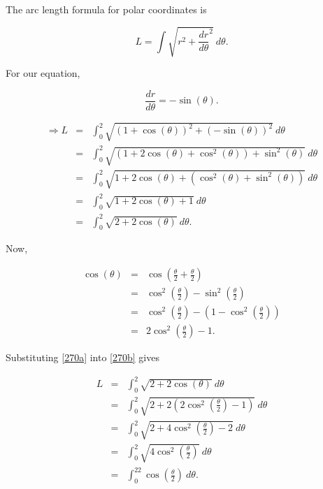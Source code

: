 

 The arc length formula for polar coordinates is

\[L=\int{\sqrt{r^2+\frac{dr}{d\theta}^2}~d\theta.}\]

For our equation,

\[\frac{dr}{d\theta}=-\sin\left(\theta\right).\]

\begin{eqnarray}
	\Rightarrow L&=&\int_0^2\sqrt{\left(1+\cos\left(\theta\right)\right)^2+\left(-\sin\left(\theta\right)\right)^2}~d\theta\nonumber\\
	&=&\int_0^2\sqrt{\left(1+2\cos\left(\theta\right)+\cos^2\left(\theta\right)\right)+\sin^2\left(\theta\right)}~d\theta\nonumber\\
	&=&\int_0^2\sqrt{1+2\cos\left(\theta\right)+\left(\cos^2\left(\theta\right)+\sin^2\left(\theta\right)\right)}~d\theta\nonumber\\
	&=&\int_0^2\sqrt{1+2\cos\left(\theta\right)+1}~d\theta\nonumber\\
	&=&\int_0^2\sqrt{2+2\cos\left(\theta\right)}~d\theta.\label{270b}
\end{eqnarray}

Now,

\begin{eqnarray}
	\cos\left(\theta\right)&=&\cos\left(\frac{\theta}{2}+\frac{\theta}{2}\right)\nonumber\\
	&=&\cos^2\left(\frac{\theta}{2}\right)-\sin^2\left(\frac{\theta}{2}\right)\nonumber\\
	&=&\cos^2\left(\frac{\theta}{2}\right)-\left(1-\cos^2\left(\frac{\theta}{2}\right)\right)\nonumber\\
	&=&2\cos^2\left(\frac{\theta}{2}\right)-1.\label{270a}
\end{eqnarray}

Substituting \vref{270a} into \vref{270b} gives

\begin{eqnarray*}
	L&=&\int_0^2\sqrt{2+2\cos\left(\theta\right)}~d\theta\\
	&=&\int_0^2\sqrt{2+2\left(2\cos^2\left(\frac{\theta}{2}\right)-1\right)}~d\theta\\
	&=&\int_0^2\sqrt{2+4\cos^2\left(\frac{\theta}{2}\right)-2}~d\theta\\
	&=&\int_0^2\sqrt{4\cos^2\left(\frac{\theta}{2}\right)}~d\theta\\
	&=&\int_0^22\cos\left(\frac{\theta}{2}\right)~d\theta.
\end{eqnarray*}

